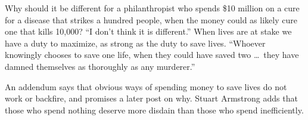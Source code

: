 Why should it be different for a philanthropist who spends \$10 million on a cure for a disease that strikes a hundred people, when the money could as likely cure one that kills 10,000? ``I don't think it is different.''  When lives are at stake we have a duty to maximize, as strong as the duty to save lives. ``Whoever knowingly chooses to save one life, when they could have saved two \ldots\ they have damned themselves as thoroughly as any murderer.'' 

An addendum says that obvious ways of spending money to save lives do not work or backfire, and promises a later post on why.  Stuart Armstrong adds that those who spend nothing deserve more disdain than those who spend inefficiently.
